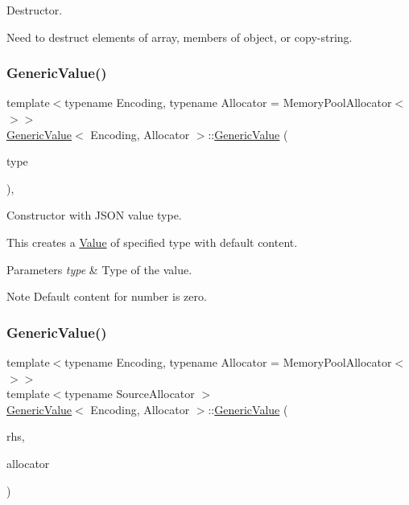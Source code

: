 Destructor. 

Need to destruct elements of array, members of object, or copy-\/string. \mbox{\label{classGenericValue_a83c8f84b8e61f2f40414b703b75aea61}} 
\subsubsection{\texorpdfstring{Generic\+Value()}{GenericValue()}\hspace{0.1cm}{\footnotesize\ttfamily [4/8]}}
{\footnotesize\ttfamily template$<$typename Encoding, typename Allocator = Memory\+Pool\+Allocator$<$$>$$>$ \\
\hyperlink{classGenericValue}{Generic\+Value}$<$ Encoding, Allocator $>$\+::\hyperlink{classGenericValue}{Generic\+Value} (\begin{DoxyParamCaption}\item[{Type}]{type }\end{DoxyParamCaption})\hspace{0.3cm}{\ttfamily [inline]}, {\ttfamily [explicit]}}



Constructor with J\+S\+ON value type. 

This creates a \hyperlink{classValue}{Value} of specified type with default content. 
\begin{DoxyParams}{Parameters}
{\em type} & Type of the value. \\
\hline
\end{DoxyParams}
\begin{DoxyNote}{Note}
Default content for number is zero. 
\end{DoxyNote}
\mbox{\label{classGenericValue_a5161c0c98ba9144c50a38acde28a5ede}} 
\subsubsection{\texorpdfstring{Generic\+Value()}{GenericValue()}\hspace{0.1cm}{\footnotesize\ttfamily [5/8]}}
{\footnotesize\ttfamily template$<$typename Encoding, typename Allocator = Memory\+Pool\+Allocator$<$$>$$>$ \\
template$<$typename Source\+Allocator $>$ \\
\hyperlink{classGenericValue}{Generic\+Value}$<$ Encoding, Allocator $>$\+::\hyperlink{classGenericValue}{Generic\+Value} (\begin{DoxyParamCaption}\item[{const \hyperlink{classGenericValue}{Generic\+Value}$<$ Encoding, Source\+Allocator $>$ \&}]{rhs,  }\item[{Allocator \&}]{allocator }\end{DoxyParamCaption})}



